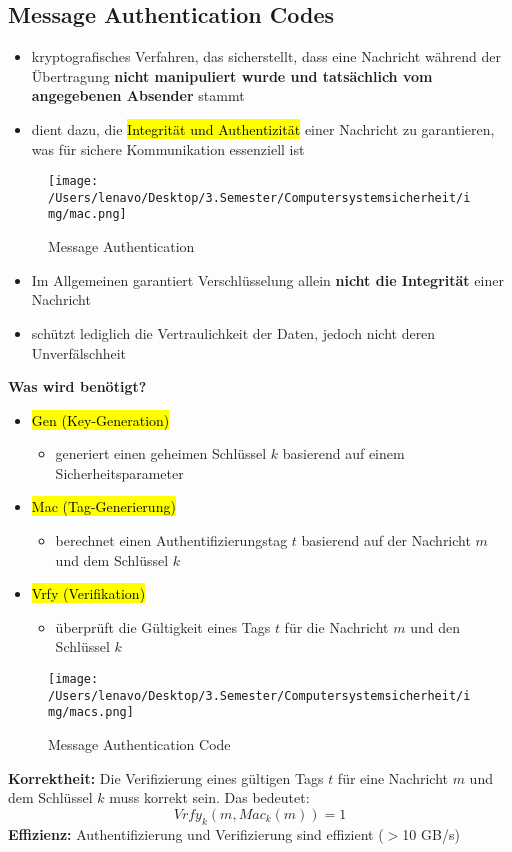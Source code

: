 \documentclass[a4paper, 10pt]{article}
\begin{document}
\subsection{Message Authentication Codes}
\begin{itemize}
    \item  kryptografisches Verfahren, das sicherstellt, dass eine Nachricht während der Übertragung \textbf{nicht manipuliert wurde und tatsächlich vom angegebenen Absender} stammt
    \item dient dazu, die \hl{Integrität und Authentizität} einer Nachricht zu garantieren, was für sichere Kommunikation essenziell ist
\end{itemize}
\newpage
\begin{figure}[h]
    \centering
    \texttt{[image: /Users/lenavo/Desktop/3.Semester/Computersystemsicherheit/img/mac.png]}
    \caption{Message Authentication}
    \label{fig:enter-label}
\end{figure}
\begin{itemize}
    \item Im Allgemeinen garantiert Verschlüsselung allein \textbf{nicht die Integrität} einer Nachricht
    \item schützt lediglich die Vertraulichkeit der Daten, jedoch nicht deren Unverfälschheit
\end{itemize}
\textbf{Was wird benötigt?}
\begin{itemize}
    \item \hl{Gen (Key-Generation)}
    \begin{itemize}
        \item generiert einen geheimen Schlüssel $k$ basierend auf einem Sicherheitsparameter
    \end{itemize}

    \item \hl{Mac (Tag-Generierung)}
    \begin{itemize}
        \item berechnet einen Authentifizierungstag $t$ basierend auf der Nachricht $m$ und dem Schlüssel $k$
    \end{itemize}

    \item \hl{Vrfy (Verifikation)}
    \begin{itemize}
        \item überprüft die Gültigkeit eines Tags $t$ für die Nachricht $m$ und den Schlüssel $k$
    \end{itemize}
\end{itemize}
\begin{figure}[h]
    \centering
    \texttt{[image: /Users/lenavo/Desktop/3.Semester/Computersystemsicherheit/img/macs.png]}
    \caption{Message Authentication Code}
    \label{fig:enter-label}
\end{figure}
\textbf{Korrektheit:}
Die Verifizierung eines gültigen Tags $t$ für eine Nachricht $m$ und dem Schlüssel $k$ muss korrekt sein. Das bedeutet:
\begin{equation}
    Vrfy_k(m, Mac_k(m)) = 1
\end{equation}
\textbf{Effizienz:}
Authentifizierung und Verifizierung sind effizient ($>$10 GB/s)
\end{document}
